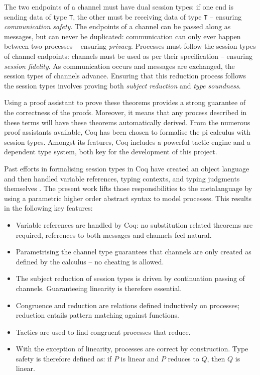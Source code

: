 \documentclass{mproj}
\begin{document}
The two endpoints of a channel must have dual session types: if one end is
sending data of type \texttt{T}, the other must be receiving data of type
\texttt{T} -- ensuring \textit{communication safety}. The endpoints of a channel
can be passed along as messages, but can never be duplicated: communication can
only ever happen between two processes -- ensuring \textit{privacy}.  Processes
must follow the session types of channel endpoints: channels must be used as per
their specification -- ensuring \textit{session fidelity}. As communication
occurs and messages are exchanged, the session types of channels advance.
Ensuring that this reduction process follows the session types involves proving
both \textit{subject reduction} and \textit{type soundness}.
\cite{Dardha2016m}

Using a proof assistant to prove these theorems provides a strong guarantee of
the correctness of the proofs. Moreover, it means that any process described in
these terms will have these theorems automatically derived. From the numerous
proof assistants available, Coq has been chosen to formalise the pi calculus
with session types. Amongst its features, Coq includes a powerful tactic engine
and a dependent type system, both key for the development of this project.

Past efforts in formalising session types in Coq have created an object language
and then handled variable references, typing contexts, and typing judgments
themselves \cite{Dilmore2019}. The present work lifts those responsibilities to
the metalanguage by using a parametric higher order abstract syntax to model
processes. This results in the following key features:

\begin{itemize}
    \item Variable references are handled by Coq: no substitution related
        theorems are required, references to both messages and channels feel
        natural.
    \item Parametrising the channel type guarantees that channels are only
        created as defined by the calculus -- no cheating is allowed.
    \item The subject reduction of session types is driven by continuation
        passing of channels. Guaranteeing linearity is therefore essential.
    \item Congruence and reduction are relations defined inductively on
        processes; reduction entails pattern matching against functions.
    \item Tactics are used to find congruent processes that reduce.
    \item With the exception of linearity, processes are correct by
        construction. Type safety is therefore defined as: if $P$ is linear and
        $P$ reduces to $Q$, then $Q$ is linear.
\end{itemize}




\end{document}
